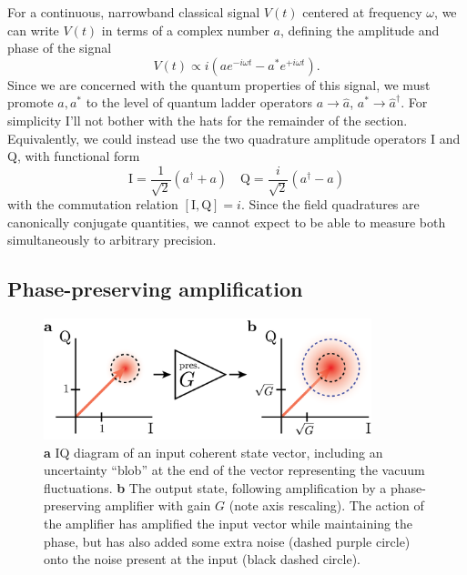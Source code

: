 For a continuous, narrowband classical signal $V(t)$ centered at frequency $\omega$, we can write $V(t)$ in terms of a complex number $a$, defining the amplitude and phase of the signal
\begin{equation}
V(t) \propto i ( a e^{-i \omega t} - a^* e^{+i \omega t} ).
\end{equation}
Since we are concerned with the quantum properties of this signal, we must promote $a,a^*$ to the level of quantum ladder operators $a \rightarrow \hat{a}$, $a^* \rightarrow \hat{a}^\dagger$.  For simplicity I'll not bother with the hats for the remainder of the section.  Equivalently, we could instead use the two quadrature amplitude operators I and Q, with functional form
\begin{equation}
\mathrm{I} = \frac{1}{\sqrt{2}} (a^\dagger + a) \quad \mathrm{Q} = \frac{i}{\sqrt{2}} (a^\dagger - a)
\end{equation}
with the commutation relation $[\mathrm{I}, \mathrm{Q}] = i$.  Since the field quadratures are canonically conjugate quantities, we cannot expect to be able to measure both simultaneously to arbitrary precision.

\subsection{Phase-preserving amplification}\label{s:phase_pres_amps}

\begin{figure}
\begin{center}
	\includegraphics[width = 3.75in]{paramps_chapter/lollipops_pres.png}
\end{center}
\caption[IQ diagram for phase-preserving amplifier]{\textbf{a} IQ diagram of an input coherent state vector, including an uncertainty ``blob'' at the end of the vector representing the vacuum fluctuations.  \textbf{b} The output state, following amplification by a phase-preserving amplifier with gain $G$ (note axis rescaling).  The action of the amplifier has amplified the input vector while maintaining the phase, but has also added some extra noise (dashed purple circle) onto the noise present at the input (black dashed circle).}
\label{fig:lollipops_pres}
\end{figure}


